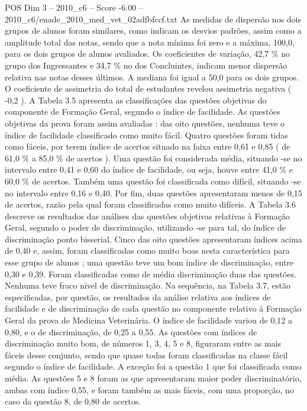 \begin{textsample}{POS Dim 3 – 2010\_c6 – Score -6.00 – 2010\_c6/enade\_2010\_med\_vet\_02adfbfccf.txt}
As medidas de dispersão nos dois grupos de alunos foram similares, como indicam os desvios padrões, assim como a amplitude total das notas, sendo que a nota mínima foi zero e a máxima, 100,0, para os dois grupos de alunos avaliados.
Os coeficientes de variação, 42,7 \% no grupo dos Ingressantes e 34,7 \% no dos Concluintes, indicam menor dispersão relativa nas notas desses últimos.
A mediana foi igual a 50,0 para os dois grupos.
O coeficiente de assimetria do total de estudantes revelou assimetria negativa ( -0,2 ).
A Tabela 3.5 apresenta as classificações das questões objetivas do componente de Formação Geral, segundo o índice de facilidade.
As questões objetivas da prova foram assim avaliadas : das oito questões, nenhuma teve o índice de facilidade classificado como muito fácil.
Quatro questões foram tidas como fáceis, por terem índice de acertos situado na faixa entre 0,61 e 0,85 ( de 61,0 \% a 85,0 \% de acertos ).
Uma questão foi considerada média, situando -se no intervalo entre 0,41 e 0,60 do índice de facilidade, ou seja, houve entre 41,0 \% e 60,0 \% de acertos.
Também uma questão foi classificada como difícil, situando -se no intervalo entre 0,16 e 0,40.
Por fim, duas questões apresentaram menos de 0,15 de acertos, razão pela qual foram classificadas como muito difíceis.
A Tabela 3.6 descreve os resultados das análises das questões objetivas relativas à Formação Geral, segundo o poder de discriminação, utilizando -se para tal, do índice de discriminação ponto bisserial.
Cinco das oito questões apresentaram índices acima de 0,40 e, assim, foram classificadas como muito boas nesta característica para esse grupo de alunos ; uma questão teve um bom índice de discriminação, entre 0,30 e 0,39.
Foram classificadas como de média discriminação duas das questões.
Nenhuma teve fraco nível de discriminação.
Na sequência, na Tabela 3.7, estão especificadas, por questão, os resultados da análise relativa aos índices de facilidade e de discriminação de cada questão no componente relativo à Formação Geral da prova de Medicina Veterinária.
O índice de facilidade variou de 0,12 a 0,80, e o de discriminação, de 0,25 a 0,55.
As questões com índices de discriminação muito bom, de números 1, 3, 4, 5 e 8, figuraram entre as mais fáceis desse conjunto, sendo que quase todas foram classificadas na classe fácil segundo o índice de facilidade.
A exceção foi a questão 1 que foi classificada como média.
As questões 5 e 8 foram as que apresentaram maior poder discriminatório, ambas com índice 0,55, e foram também as mais fáceis, com uma proporção, no caso da questão 8, de 0,80 de acertos.

\end{textsample}
